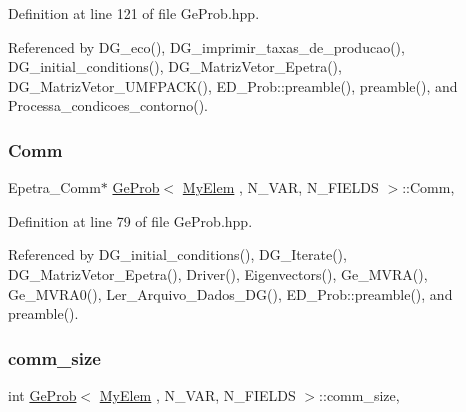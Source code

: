Definition at line 121 of file Ge\+Prob.\+hpp.



Referenced by D\+G\+\_\+eco(), D\+G\+\_\+imprimir\+\_\+taxas\+\_\+de\+\_\+producao(), D\+G\+\_\+initial\+\_\+conditions(), D\+G\+\_\+\+Matriz\+Vetor\+\_\+\+Epetra(), D\+G\+\_\+\+Matriz\+Vetor\+\_\+\+U\+M\+F\+P\+A\+C\+K(), E\+D\+\_\+\+Prob\+::preamble(), preamble(), and Processa\+\_\+condicoes\+\_\+contorno().

\mbox{\label{classGeProb_a28a1d41fc8c294fe629b95901df8f4e3}} 
\subsubsection{\texorpdfstring{Comm}{Comm}}
{\footnotesize\ttfamily Epetra\+\_\+\+Comm$\ast$ \hyperlink{classGeProb}{Ge\+Prob}$<$ \hyperlink{DG__Prob_8h_a83cd887ced9a6587428f267e50cd4787}{My\+Elem} , N\+\_\+\+V\+AR, N\+\_\+\+F\+I\+E\+L\+DS $>$\+::Comm\hspace{0.3cm}{\ttfamily [protected]}, {\ttfamily [inherited]}}



Definition at line 79 of file Ge\+Prob.\+hpp.



Referenced by D\+G\+\_\+initial\+\_\+conditions(), D\+G\+\_\+\+Iterate(), D\+G\+\_\+\+Matriz\+Vetor\+\_\+\+Epetra(), Driver(), Eigenvectors(), Ge\+\_\+\+M\+V\+R\+A(), Ge\+\_\+\+M\+V\+R\+A0(), Ler\+\_\+\+Arquivo\+\_\+\+Dados\+\_\+\+D\+G(), E\+D\+\_\+\+Prob\+::preamble(), and preamble().

\mbox{\label{classGeProb_ab5aa970c9864597a442bfc8519352730}} 
\subsubsection{\texorpdfstring{comm\+\_\+size}{comm\_size}}
{\footnotesize\ttfamily int \hyperlink{classGeProb}{Ge\+Prob}$<$ \hyperlink{DG__Prob_8h_a83cd887ced9a6587428f267e50cd4787}{My\+Elem} , N\+\_\+\+V\+AR, N\+\_\+\+F\+I\+E\+L\+DS $>$\+::comm\+\_\+size\hspace{0.3cm}{\ttfamily [protected]}, {\ttfamily [inherited]}}



